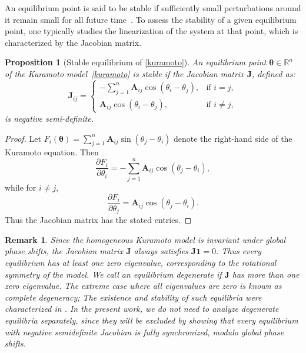 \documentclass[11pt,reqno]{amsart}
\newtheorem{proposition}[theorem]{Proposition}
\newtheorem{remark}[theorem]{Remark}
\theoremstyle{definition}
\begin{document}
An equilibrium point is said to be stable if sufficiently small perturbations around it remain small for all future time~\cite{khalil2002nonlinear}. 
To assess the stability of a given equilibrium point, one typically studies the linearization of the system at that point, which is characterized by the Jacobian matrix.

\begin{proposition}[Stable equilibrium of \eqref{kuramoto}]\label{second-order1}
	An equilibrium point \(\boldsymbol{\theta}\in\mathbb{R}^n\) of the Kuramoto model~\eqref{kuramoto} is stable if the Jacobian matrix \(\boldsymbol{\mathbf{J}}\), defined as: \[\boldsymbol{\mathbf{J}}_{ij} = \begin{cases}
    -\sum_{j=1}^n \boldsymbol{A}_{ij} \cos(\theta_i - \theta_j), & \text{if } i = j, \\[8pt]
    \boldsymbol{A}_{ij} \cos(\theta_i - \theta_j), & \text{if } i \neq j, \end{cases}\] is negative semi-definite.
\end{proposition}

\begin{proof}
Let $F_i(\boldsymbol\theta)=\sum_{j=1}^n \boldsymbol{A}_{ij}\sin(\theta_j-\theta_i)$ denote the right-hand side of the Kuramoto equation. Then \[\frac{\partial F_i}{\partial \theta_i}=-\sum_{j=1}^n \boldsymbol{A}_{ij}\cos(\theta_j-\theta_i),\] while for $i\neq j$, \[\frac{\partial F_i}{\partial \theta_j}=\boldsymbol{A}_{ij}\cos(\theta_j-\theta_i).\] Thus the Jacobian matrix has the stated entries.
\end{proof}

\begin{remark}
Since the homogeneous Kuramoto model is invariant under global phase shifts, the Jacobian matrix $\mathbf J$ always satisfies $\mathbf J \mathbf 1=0$. Thus every equilibrium has at least one zero eigenvalue, corresponding to the rotational symmetry of the model. We call an equilibrium \emph{degenerate} if $\mathbf J$ has more than one zero eigenvalue. The extreme case where all eigenvalues are zero is known as \emph{complete degeneracy}; The existence and stability of such equilibria were characterized in \cite{sclosa2024completely}. In the present work, we do not need to analyze degenerate equilibria separately, since they will be excluded by showing that every equilibrium with negative semidefinite Jacobian is fully synchronized, modulo global phase shifts.
\end{remark}
\end{document}
